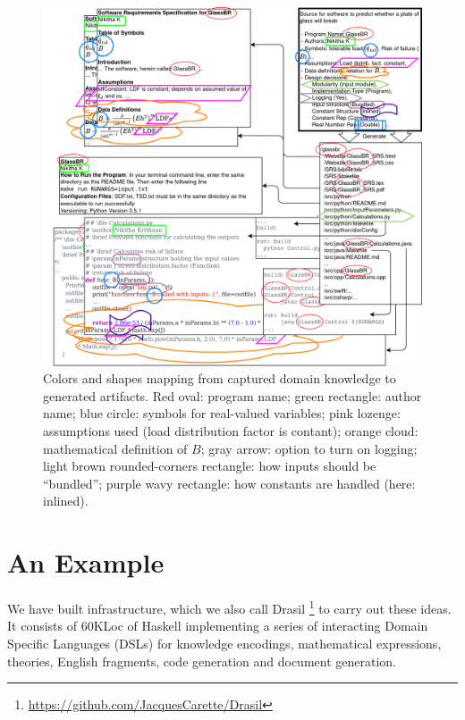 \documentclass[a4paper,UKenglish,cleveref,autoref,thm-restate]{oasics-v2021}
\begin{document}
\begin{figure}[t!]
  \centering
  \includegraphics[width=\linewidth]{assets/DrasilSupportsChange-right-portrait-overlapped-ungrouped-11ptFont-squished-blind-v1-300dpi.png}
  \caption{Colors and shapes mapping from captured domain knowledge to generated
  artifacts. Red oval: program name; green rectangle: author name; blue circle:
  symbols for real-valued variables; pink lozenge: assumptions used (load 
  distribution factor is contant);
  orange cloud: mathematical definition of $B$; gray arrow: option to turn on
  logging; light brown rounded-corners rectangle: how inputs should be ``bundled'';
  purple wavy rectangle: how constants are handled (here: inlined).}
  \label{Fig_DrasilAndChange}
\end{figure}

\section{An Example}
\label{sec:example}

We have built infrastructure, which we also call Drasil%
\footnote{\url{https://github.com/JacquesCarette/Drasil}} 
to carry out these ideas. It consists of 60KLoc of Haskell
implementing a series of interacting Domain Specific Languages (DSLs) for
knowledge encodings, mathematical expressions, theories, English fragments,
code generation and document generation.  
\end{document}

